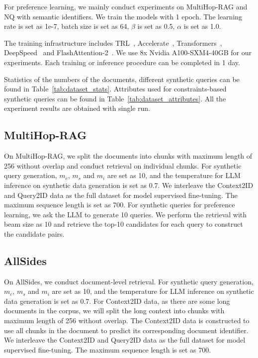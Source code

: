 For preference learning, we mainly conduct experiments on MultiHop-RAG and NQ with semantic identifiers. We train the models with 1 epoch. The learning rate is set as 1e-7, batch size is set as 64, $\beta$ is set as 0.5, $\alpha$ is set as 1.0. 

The training infrastructure includes TRL~\citep{vonwerra2022trl}, Accelerate~\citep{accelerate}, Transformers~\citep{wolf-etal-2020-transformers}, DeepSpeed~\cite{DBLP:conf/kdd/RasleyRRH20} and FlashAttention-2~\citep{DBLP:conf/iclr/Dao24}. We use 8x Nvidia A100-SXM4-40GB for our experiments. Each training or inference procedure can be completed in 1 day.

Statistics of the numbers of the documents, different synthetic queries can be found in Table~\ref{tab:dataset_stats}. Attributes used for constraints-based synthetic queries can be found in Table~\ref{tab:dataset_attributes}. All the experiment results are obtained with single run.
\label{app:data_specific_setup}
\subsection{MultiHop-RAG}
On MultiHop-RAG, we split the documents into chunks with maximum length of 256 without overlap and conduct retrieval on individual chunks. For synthetic query generation, $m_c$, $m_s$ and $m_i$ are set as 10, and the temperature for LLM inference on synthetic data generation is set as 0.7. We interleave the Context2ID and Query2ID data as the full dataset for model supervised fine-tuning. The maximum sequence length is set as 700. For synthetic queries for preference learning, we ask the LLM to generate 10 queries. We perform the retrieval with beam size as 10 and retrieve the top-10 candidates for each query to construct the candidate pairs.
\subsection{AllSides}
On AllSides, we conduct document-level retrieval. For synthetic query generation, $m_c$, $m_s$ and $m_i$ are set as 10, and the temperature for LLM inference on synthetic data generation is set as 0.7. For Context2ID data, as there are some long documents in the corpus, we will split the long context into chunks with maximum length of 256 without overlap. The Context2ID data is constructed to use all chunks in the document to predict its corresponding document identifier. We interleave the Context2ID and Query2ID data as the full dataset for model supervised fine-tuning. The maximum sequence length is set as 700.
